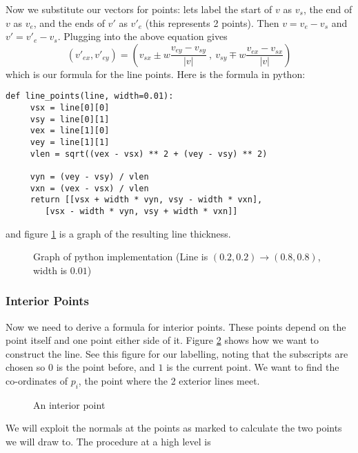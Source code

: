 \documentclass[]{article}
\begin{document}
Now we substitute our vectors for points: lets label the start of $v$ as $v_s$, the end of $v$ as $v_e$, and the ends of $v'$ as $v'_e$ (this represents 2 points). Then $v = v_e - v_s$ and $v' = v'_e - v_s$. Plugging into the above equation gives
\begin{equation}
(v'_{ex}, v'_{ey}) = \left(v_{sx} \pm w \frac{v_{ey} - v_{sy}}{|v|}\ ,\ v_{sy} \mp w \frac{v_{ex} - v_{sx}}{|v|}\right)
\end{equation}
which is our formula for the line points.
Here is the formula in python:
\lstset{language=Python}
\begin{lstlisting}
def line_points(line, width=0.01):
     vsx = line[0][0]
     vsy = line[0][1]
     vex = line[1][0]
     vey = line[1][1]
     vlen = sqrt((vex - vsx) ** 2 + (vey - vsy) ** 2)
     
     vyn = (vey - vsy) / vlen
     vxn = (vex - vsx) / vlen
     return [[vsx + width * vyn, vsy - width * vxn], 
     	[vsx - width * vyn, vsy + width * vxn]]
\end{lstlisting}
and figure \ref{fig:python_impl} is a graph of the resulting line thickness.

\begin{figure}[!htbp]
	\centering
	\def\svgwidth{300pt}
	
	\caption{Graph of python implementation (Line is $(0.2, 0.2) \rightarrow (0.8, 0.8)$, width is $0.01$)}
	\label{fig:python_impl}
\end{figure}

\subsubsection{Interior Points}

Now we need to derive a formula for interior points. These points depend on the point itself and one point either side of it. Figure \ref{fig:linegraph-interior} shows how we want to construct the line. See this figure for our labelling, noting that the subscripts are chosen so $0$ is the point before, and $1$ is the current point. We want to find the co-ordinates of $p_i$, the point where the 2 exterior lines meet.

\begin{figure}[!htbp]
	\centering
	\def\svgwidth{300pt}
	
	\caption{An interior point}
	\label{fig:linegraph-interior}
\end{figure}

We will exploit the normals at the points as marked to calculate the two points we will draw to. The procedure at a high level is
\end{document}
